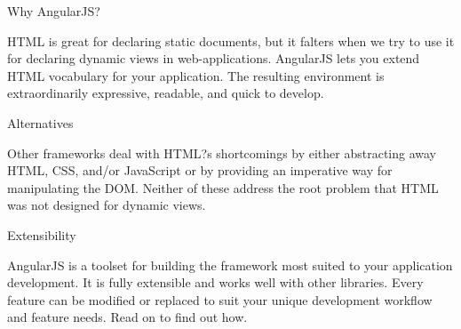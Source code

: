 Why AngularJS?

HTML is great for declaring static documents, but it falters when we try to use it for declaring dynamic views in web-applications. AngularJS lets you extend HTML vocabulary for your application. The resulting environment is extraordinarily expressive, readable, and quick to develop.

Alternatives

Other frameworks deal with HTML?s shortcomings by either abstracting away HTML, CSS, and/or JavaScript or by providing an imperative way for manipulating the DOM. Neither of these address the root problem that HTML was not designed for dynamic views.

Extensibility

AngularJS is a toolset for building the framework most suited to your application development. It is fully extensible and works well with other libraries. Every feature can be modified or replaced to suit your unique development workflow and feature needs. Read on to find out how.